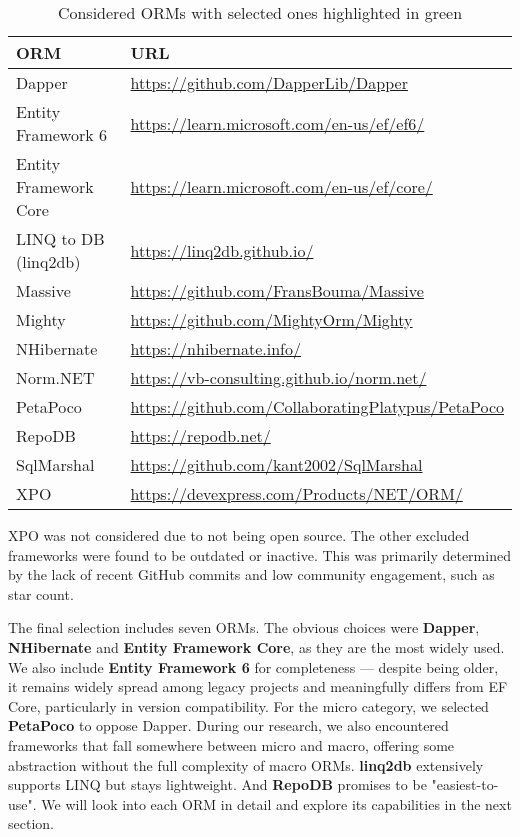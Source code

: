 \begin{table}[h]
\centering
\begin{tabular}{|l|l|}
\hline
\textbf{ORM} & \textbf{URL} \\
\hline
\cellcolor{lightgreen}Dapper & \url{https://github.com/DapperLib/Dapper} \\
\cellcolor{lightgreen}Entity Framework 6 & \url{https://learn.microsoft.com/en-us/ef/ef6/} \\
\cellcolor{lightgreen}Entity Framework Core & \url{https://learn.microsoft.com/en-us/ef/core/} \\
\cellcolor{lightgreen}LINQ to DB (linq2db) & \url{https://linq2db.github.io/} \\
Massive & \url{https://github.com/FransBouma/Massive} \\
Mighty & \url{https://github.com/MightyOrm/Mighty} \\
\cellcolor{lightgreen}NHibernate & \url{https://nhibernate.info/} \\
Norm.NET & \url{https://vb-consulting.github.io/norm.net/} \\
\cellcolor{lightgreen}PetaPoco & \url{https://github.com/CollaboratingPlatypus/PetaPoco} \\
\cellcolor{lightgreen}RepoDB & \url{https://repodb.net/} \\
SqlMarshal & \url{https://github.com/kant2002/SqlMarshal} \\
XPO & \url{https://devexpress.com/Products/NET/ORM/} \\
\hline
\end{tabular}
\caption{Considered ORMs with selected ones highlighted in green\label{tab:orm-docs}}
\end{table}

XPO was not considered due to not being open source. The other excluded frameworks were found to be outdated or inactive. This was primarily determined by the lack of recent GitHub commits and low community engagement, such as star count. 

The final selection includes seven ORMs. The obvious choices were \textbf{Dapper}, \textbf{NHibernate} and \textbf{Entity Framework Core}, as they are the most widely used. We also include \textbf{Entity Framework 6} for completeness --- despite being older, it remains widely spread among legacy projects and meaningfully differs from EF Core, particularly in version compatibility. For the micro category, we selected \textbf{PetaPoco} to oppose Dapper. During our research, we also encountered frameworks that fall somewhere between micro and macro, offering some abstraction without the full complexity of macro ORMs. \textbf{linq2db} extensively supports LINQ but stays lightweight. And \textbf{RepoDB} promises to be "easiest-to-use"\cite{RepoDB}. We will look into each ORM in detail and explore its capabilities in the next section.